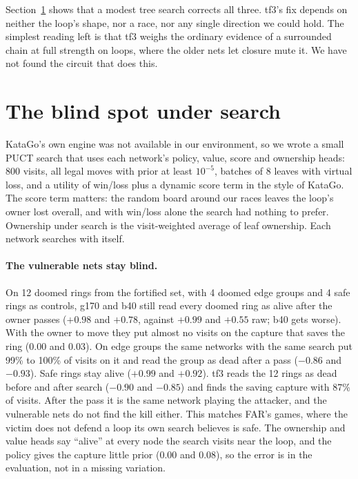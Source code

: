 \documentclass[11pt]{article}
\newcommand{\pos}[1]{$+#1$}
\newcommand{\nega}[1]{$-#1$}
\begin{document}
Section~\ref{sec:search} shows that a modest tree search corrects all three. tf3's fix depends on neither the loop's shape, nor a race, nor any single direction we could hold. The simplest reading left is that tf3 weighs the ordinary evidence of a surrounded chain at full strength on loops, where the older nets let closure mute it. We have not found the circuit that does this.

\section{The blind spot under search}
\label{sec:search}

KataGo's own engine was not available in our environment, so we wrote a small PUCT search that uses each network's policy, value, score and ownership heads: 800 visits, all legal moves with prior at least $10^{-5}$, batches of 8 leaves with virtual loss, and a utility of win/loss plus a dynamic score term in the style of KataGo. The score term matters: the random board around our races leaves the loop's owner lost overall, and with win/loss alone the search had nothing to prefer. Ownership under search is the visit-weighted average of leaf ownership. Each network searches with itself.

\paragraph{The vulnerable nets stay blind.} On 12 doomed rings from the fortified set, with 4 doomed edge groups and 4 safe rings as controls, g170 and b40 still read every doomed ring as alive after the owner passes (\pos{0.98} and \pos{0.78}, against \pos{0.99} and \pos{0.55} raw; b40 gets worse). With the owner to move they put almost no visits on the capture that saves the ring (0.00 and 0.03). On edge groups the same networks with the same search put 99\% to 100\% of visits on it and read the group as dead after a pass (\nega{0.86} and \nega{0.93}). Safe rings stay alive (\pos{0.99} and \pos{0.92}). tf3 reads the 12 rings as dead before and after search (\nega{0.90} and \nega{0.85}) and finds the saving capture with 87\% of visits. After the pass it is the same network playing the attacker, and the vulnerable nets do not find the kill either. This matches FAR's games, where the victim does not defend a loop its own search believes is safe. The ownership and value heads say ``alive'' at every node the search visits near the loop, and the policy gives the capture little prior (0.00 and 0.08), so the error is in the evaluation, not in a missing variation.
\end{document}
